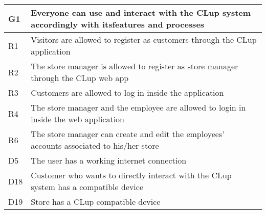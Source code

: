\begin{center}
        {\renewcommand{\arraystretch}{1.5}
        \begin{longtable}{L{2cm}L{12cm}}
            \hline
            \textbf{G1} & \textbf{Everyone can use and interact with the CLup system accordingly with itsfeatures and processes} \\
            \hline
             R1 & Visitors are allowed to register as customers through the CLup application \\
            \hline
             R2 & The store manager is allowed to register as store manager through the CLup web app \\
            \hline
             R3 & Customers are allowed to log in inside the application \\
            \hline
             R4 & The store manager and the employee are allowed to login in inside the web application \\
            \hline
             R6 & The store manager can create and edit the employees’ accounts associated to his/her store \\
            \hline
             D5 & The user has a working internet connection \\
            \hline
             D18 & Customer who wants to directly interact with the CLup system has a compatible device \\
            \hline
             D19 & Store has a CLup compatible device \\
            \hline
        \end{longtable}}


\end{center}
